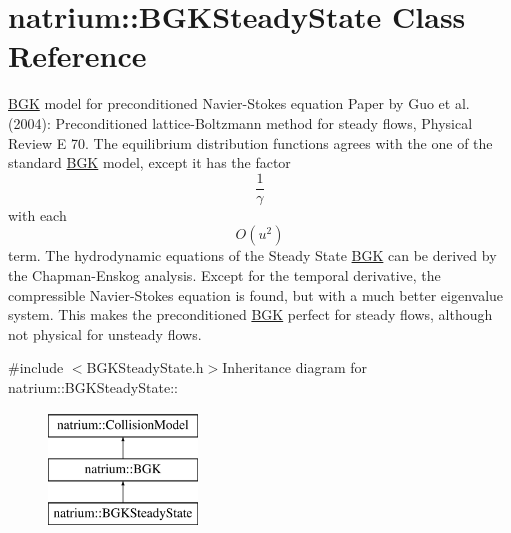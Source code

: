 \hypertarget{classnatrium_1_1BGKSteadyState}{
\section{natrium::BGKSteadyState Class Reference}
\label{classnatrium_1_1BGKSteadyState}
}


\hyperlink{classnatrium_1_1BGK}{BGK} model for preconditioned Navier-\/Stokes equation Paper by Guo et al. (2004): Preconditioned lattice-\/Boltzmann method for steady flows, Physical Review E 70. The equilibrium distribution functions agrees with the one of the standard \hyperlink{classnatrium_1_1BGK}{BGK} model, except it has the factor \[\frac{1}{\gamma}\] with each \[ O(u^2) \] term. The hydrodynamic equations of the Steady State \hyperlink{classnatrium_1_1BGK}{BGK} can be derived by the Chapman-\/Enskog analysis. Except for the temporal derivative, the compressible Navier-\/Stokes equation is found, but with a much better eigenvalue system. This makes the preconditioned \hyperlink{classnatrium_1_1BGK}{BGK} perfect for steady flows, although not physical for unsteady flows.  


{\ttfamily \#include $<$BGKSteadyState.h$>$}Inheritance diagram for natrium::BGKSteadyState::\begin{figure}[H]
\begin{center}
\leavevmode
\includegraphics[height=3cm]{classnatrium_1_1BGKSteadyState}
\end{center}
\end{figure}
